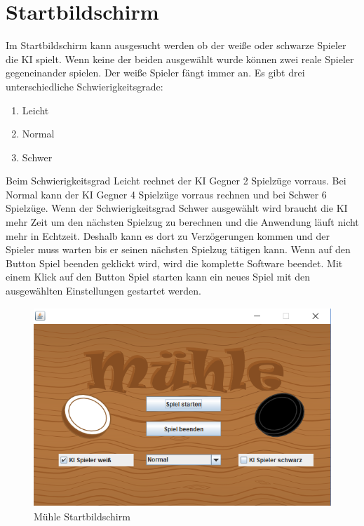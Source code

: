 \documentclass[oneside]{ausarbeitung}
\begin{document}
\clearpage

\section{Startbildschirm}

Im Startbildschirm kann ausgesucht werden ob der weiße oder schwarze Spieler die KI spielt. Wenn keine der beiden ausgewählt wurde können zwei reale Spieler gegeneinander spielen. Der weiße Spieler fängt immer an. Es gibt drei unterschiedliche Schwierigkeitsgrade:

\begin{enumerate}
\item Leicht
\item Normal
\item Schwer
\end{enumerate}

Beim Schwierigkeitsgrad Leicht rechnet der KI Gegner 2 Spielzüge vorraus. Bei Normal kann der KI Gegner 4 Spielzüge vorraus rechnen und bei Schwer 6 Spielzüge. Wenn der Schwierigkeitsgrad Schwer ausgewählt wird braucht die KI mehr Zeit um den nächsten Spielzug zu berechnen und die Anwendung läuft nicht mehr in Echtzeit. Deshalb kann es dort zu Verzögerungen kommen und der Spieler muss warten bis er seinen nächsten Spielzug tätigen kann. Wenn auf den Button Spiel beenden geklickt wird, wird die komplette Software beendet. Mit einem Klick auf den Button Spiel starten kann ein neues Spiel mit den ausgewählten Einstellungen gestartet werden.

\begin{figure}[ht]
	\centering
	\includegraphics[width=12.5cm,height=7.5cm]{images/MuehleStartbildschirm.png}
	\caption[Mühle Startbildschirm]{Mühle Startbildschirm}
\end{figure}
\end{document}
